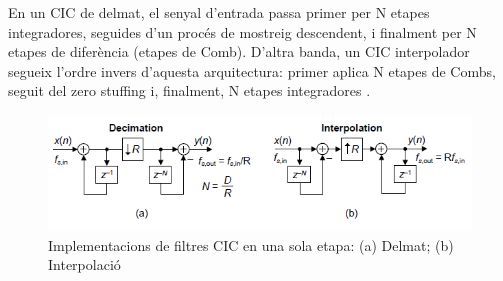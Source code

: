 \par En un CIC de delmat, el senyal d'entrada passa primer per N etapes integradores, seguides d'un procés de mostreig descendent, i finalment per N etapes de diferència (etapes de Comb). D'altra banda, un CIC interpolador segueix l'ordre invers d'aquesta arquitectura: primer aplica N etapes de Combs, seguit del zero stuffing i, finalment, N etapes integradores \cite{Hogenauer1981}.
\begin{figure}[H]
    \centering
    \includegraphics[width=0.7\linewidth]{Images/CIC_digital_filters.png}
    \caption{Implementacions de filtres CIC en una sola etapa: (a) Delmat; (b) Interpolació \cite{CICLyons}}
    \label{figCICDeciInt}
\end{figure}
\newpage
